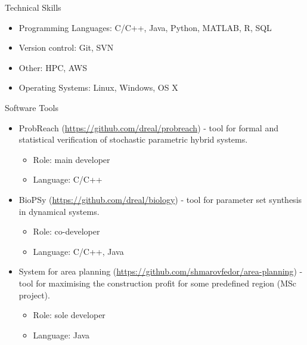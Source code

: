 \documentclass{resume} %
\begin{document}
\pagebreak

\begin{rSection}{Technical Skills}
\begin{itemize}
	\item Programming Languages: C/C++, Java, Python, MATLAB, R, SQL
	\item Version control: Git, SVN
	\item Other: HPC, AWS
	\item Operating Systems: Linux, Windows, OS X
\end{itemize}
\end{rSection}


\begin{rSection}{Software Tools}
\begin{itemize}
	\item ProbReach (\url{https://github.com/dreal/probreach}) - tool for formal and statistical
	verification of stochastic parametric hybrid systems.
	\begin{itemize}
		\item Role: main developer
		\item Language: C/C++
	\end{itemize}
	\item BioPSy (\url{https://github.com/dreal/biology}) - tool for parameter set synthesis
	in dynamical systems.
	\begin{itemize}
		\item Role: co-developer
		\item Language: C/C++, Java
	\end{itemize}
	\item System for area planning (\url{https://github.com/shmarovfedor/area-planning}) - 
	tool for maximising the construction profit for some predefined region (MSc project).
	\begin{itemize}
		\item Role: sole developer
		\item Language: Java
	\end{itemize}
\end{itemize}
\end{rSection}
\end{document}
